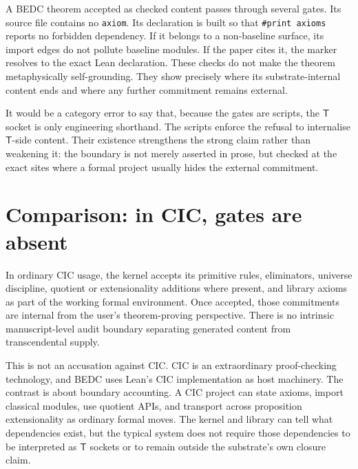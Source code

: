 \begin{example}
\label{ex:audit-gates-theorem-through-membrane}
A BEDC theorem accepted as checked content passes through several gates. Its source file contains no \texttt{axiom}. Its declaration is built so that \texttt{\#print axioms} reports no forbidden dependency. If it belongs to a non-baseline surface, its import edges do not pollute baseline modules. If the paper cites it, the marker resolves to the exact Lean declaration. These checks do not make the theorem metaphysically self-grounding. They show precisely where its substrate-internal content ends and where any further commitment remains external.
\end{example}

\begin{remark}
\label{rem:audit-gates-do-not-soften-T}
It would be a category error to say that, because the gates are scripts, the $\mathsf{T}$ socket is only engineering shorthand. The scripts enforce the refusal to internalise $\mathsf{T}$-side content. Their existence strengthens the strong claim rather than weakening it: the boundary is not merely asserted in prose, but checked at the exact sites where a formal project usually hides the external commitment.
\end{remark}

\section{Comparison: in CIC, gates are absent}
\label{sec:audit-gates-comparison-cic}

\begin{principle}
\label{prin:audit-gates-cic-internalizes}
In ordinary CIC usage, the kernel accepts its primitive rules, eliminators, universe discipline, quotient or extensionality additions where present, and library axioms as part of the working formal environment. Once accepted, those commitments are internal from the user's theorem-proving perspective. There is no intrinsic manuscript-level audit boundary separating generated content from transcendental supply.
\end{principle}

This is not an accusation against CIC. CIC is an extraordinary proof-checking technology, and BEDC uses Lean's CIC implementation as host machinery. The contrast is about boundary accounting. A CIC project can state axioms, import classical modules, use quotient APIs, and transport across proposition extensionality as ordinary formal moves. The kernel and library can tell what dependencies exist, but the typical system does not require those dependencies to be interpreted as $\mathsf{T}$ sockets or to remain outside the substrate's own closure claim.

